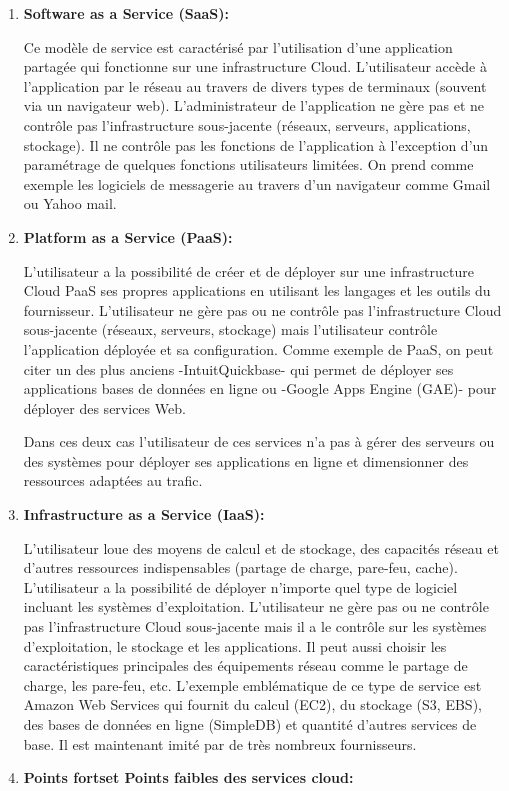 \begin{enumerate}
\item 	\textbf{Software as a Service (SaaS):}

Ce modèle de service est caractérisé par l’utilisation d’une application partagée qui fonctionne sur une infrastructure Cloud. L’utilisateur accède à l’application par le réseau au travers de divers types de terminaux (souvent via un navigateur web). L’administrateur de l’application ne gère pas et ne contrôle pas l’infrastructure sous-jacente (réseaux, serveurs, applications, stockage).  Il ne contrôle pas les fonctions de l’application à l’exception d’un paramétrage de quelques fonctions utilisateurs limitées. On prend comme exemple les logiciels de messagerie au travers d’un navigateur comme Gmail ou Yahoo mail. 

\item  \textbf{ Platform as a Service (PaaS):}

L’utilisateur a la possibilité de créer et de déployer sur une infrastructure Cloud PaaS ses propres applications en utilisant les langages et les outils du fournisseur. L’utilisateur ne gère pas ou ne contrôle pas l’infrastructure Cloud sous-jacente (réseaux, serveurs, stockage) mais l’utilisateur contrôle l’application déployée et sa configuration. Comme exemple de PaaS, on peut citer un des plus anciens -IntuitQuickbase- qui permet de déployer ses applications bases de données en ligne ou -Google Apps Engine (GAE)- pour déployer des services Web. 

Dans ces deux cas l’utilisateur de ces services n’a pas à gérer des serveurs ou des systèmes pour déployer ses applications en ligne et dimensionner des ressources adaptées au trafic.
\item   \textbf{Infrastructure as a Service (IaaS):}

L’utilisateur loue des moyens de calcul et de stockage, des capacités réseau et d’autres ressources indispensables (partage de charge, pare-feu, cache). L’utilisateur a la possibilité de déployer n’importe quel type de logiciel incluant les systèmes d’exploitation. L’utilisateur ne gère pas ou ne contrôle pas l’infrastructure Cloud sous-jacente mais il a le contrôle sur les systèmes d’exploitation, le stockage et les applications. Il peut aussi choisir les caractéristiques principales des équipements réseau comme le partage de charge, les pare-feu, etc. L’exemple emblématique de ce type de service est Amazon Web Services qui fournit du calcul (EC2), du stockage (S3, EBS), des bases de données en ligne (SimpleDB) et quantité d’autres services de base. Il est maintenant imité par de très nombreux fournisseurs.
	\item \textbf{Points fortset Points faibles des services cloud:} 
\end{enumerate}
